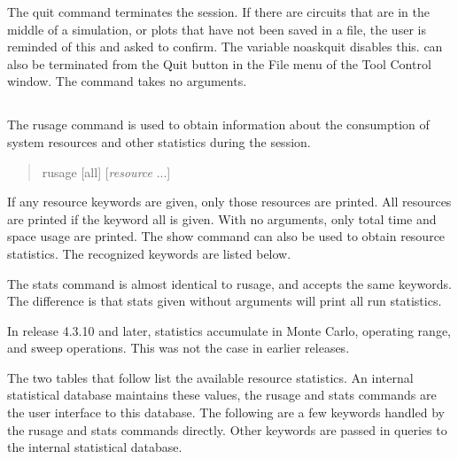
The {\cb quit} command terminates the {\WRspice} session.  If there
are circuits that are in the middle of a simulation, or plots that
have not been saved in a file, the user is reminded of this and
asked to confirm.  The variable {\et noaskquit} disables this. 
{\WRspice} can also be terminated from the {\cb Quit} button in the
{\cb File} menu of the {\cb Tool Control} window.  The command takes
no arguments.

\subsection{}
\label{rusage}


The {\cb rusage} command is used to obtain information about the
consumption of system resources and other statistics during the
{\WRspice} session.
\begin{quote}\vt
rusage [all] [{\it resource\/} ...]
\end{quote}
If any resource keywords are given, only those resources are printed. 
All resources are printed if the keyword {\vt all} is given.  With no
arguments, only total time and space usage are printed.  The {\cb
show} command can also be used to obtain resource statistics.  The
recognized keywords are listed below.

The {\cb stats} command is almost identical to {\cb rusage}, and
accepts the same keywords.  The difference is that {\cb stats} given
without arguments will print all run statistics.

In release 4.3.10 and later, statistics accumulate in Monte Carlo,
operating range, and sweep operations.  This was not the case in
earlier releases.

The two tables that follow list the available resource statistics.  An
internal statistical database maintains these values, the {\cb rusage}
and {\cb stats} commands are the user interface to this database.  The
following are a few keywords handled by the {\cb rusage} and {\cb
stats} commands directly.  Other keywords are passed in queries to the
internal statistical database.

